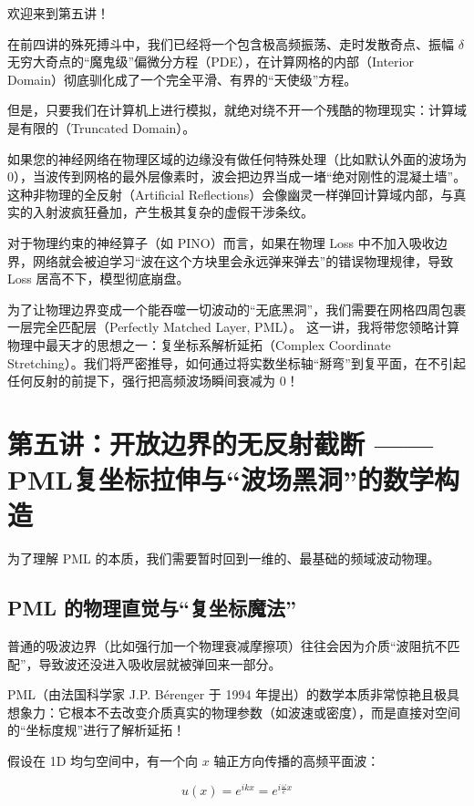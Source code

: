 \documentclass[12pt]{article}
\begin{document}
{欢迎来到第五讲！

在前四讲的殊死搏斗中，我们已经将一个包含极高频振荡、走时发散奇点、振幅 $\delta$ 无穷大奇点的“魔鬼级”偏微分方程（PDE），在计算网格的内部（Interior Domain）彻底驯化成了一个完全平滑、有界的“天使级”方程。

但是，只要我们在计算机上进行模拟，就绝对绕不开一个残酷的物理现实：计算域是有限的（Truncated Domain）。

如果您的神经网络在物理区域的边缘没有做任何特殊处理（比如默认外面的波场为 0），当波传到网格的最外层像素时，波会把边界当成一堵“绝对刚性的混凝土墙”。这种非物理的全反射（Artificial Reflections）会像幽灵一样弹回计算域内部，与真实的入射波疯狂叠加，产生极其复杂的虚假干涉条纹。

对于物理约束的神经算子（如 PINO）而言，如果在物理 Loss 中不加入吸收边界，网络就会被迫学习“波在这个方块里会永远弹来弹去”的错误物理规律，导致 Loss 居高不下，模型彻底崩盘。

为了让物理边界变成一个能吞噬一切波动的“无底黑洞”，我们需要在网格四周包裹一层完全匹配层（Perfectly Matched Layer, PML）。
这一讲，我将带您领略计算物理中最天才的思想之一：复坐标系解析延拓（Complex Coordinate Stretching）。我们将严密推导，如何通过将实数坐标轴“掰弯”到复平面，在不引起任何反射的前提下，强行把高频波场瞬间衰减为 0！

\section{第五讲：开放边界的无反射截断 —— PML复坐标拉伸与“波场黑洞”的数学构造}

为了理解 PML 的本质，我们需要暂时回到一维的、最基础的频域波动物理。

\subsection{PML 的物理直觉与“复坐标魔法”}

普通的吸波边界（比如强行加一个物理衰减摩擦项）往往会因为介质“波阻抗不匹配”，导致波还没进入吸收层就被弹回来一部分。

PML（由法国科学家 J.P. Bérenger 于 1994 年提出）的数学本质非常惊艳且极具想象力：它根本不去改变介质真实的物理参数（如波速或密度），而是直接对空间的“坐标度规”进行了解析延拓！

假设在 1D 均匀空间中，有一个向 $x$ 轴正方向传播的高频平面波：

\begin{equation}
u(x) = e^{i k x} = e^{i \frac{\omega}{c} x}
\label{eq:5-1}
\end{equation}

}
\end{document}
